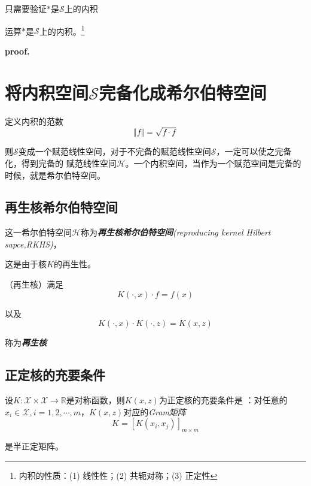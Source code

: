 只需要验证$*$是$\mathcal{S}$上的内积

\begin{proposition}
    运算$*$是$\mathcal{S}$上的内积。\footnote{内积的性质：(1) 线性性；(2) 共轭对称；(3) 正定性}
\end{proposition}
\textbf{proof. }

\section{将内积空间$\mathcal{S}$完备化成希尔伯特空间}

定义内积的范数
\begin{equation}
    \Vert f\Vert=\sqrt{f\cdot f}
\end{equation}

则$\mathcal{S}$变成一个赋范线性空间，对于不完备的赋范线性空间$\mathcal{S}$，一定可以使之完备化，得到完备的
赋范线性空间$\mathcal{H}$。一个内积空间，当作为一个赋范空间是完备的时候，就是希尔伯特空间。

\subsection*{再生核希尔伯特空间}

这一希尔伯特空间$\mathcal{H}$称为\textsl{\textbf{再生核希尔伯特空间}(reproducing kernel Hilbert sapce,RKHS)}，

这是由于核$K$的再生性。

\begin{define}
    （再生核）满足
    \begin{equation}
        K(\cdot,x)\cdot f=f(x)
    \end{equation}

    以及
    \begin{equation}
        K(\cdot,x)\cdot K(\cdot,z)=K(x,z)
    \end{equation}

    称为\textsl{\textbf{再生核}}
\end{define}

\subsection*{正定核的充要条件}
\begin{theorem}
    设$K:\mathcal{X}\times \mathcal{X}\rightarrow \mathbb{R}$是对称函数，则$K(x,z)$为正定核的充要条件是
    ：对任意的$x_i\in \mathcal{X},i=1,2,\cdots,m$，$K(x,z)$对应的\textsl{Gram矩阵}
    \begin{equation}
        K=[K(x_i,x_j)]_{m\times m}
    \end{equation}

    是半正定矩阵。
\end{theorem}

